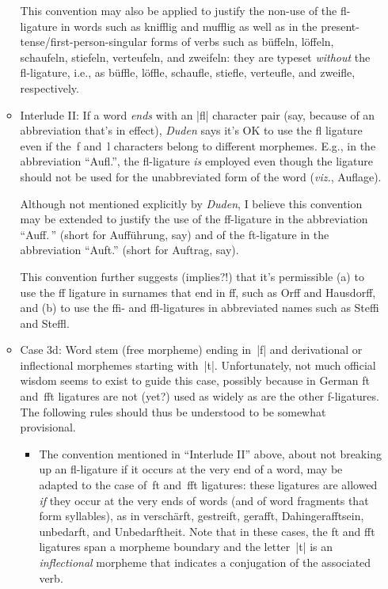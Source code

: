 \documentclass[11pt]{article}
\begin{document}
\begin{itemize}
\begin{itemize}
This convention may also be applied to justify the non-use of the fl-ligature in words such as knifflig and mufflig as well as in the present-tense/first-person-singular forms of verbs such as büffeln, löffeln, schaufeln, stiefeln, verteufeln, and zweifeln: they are typeset \emph{without} the fl-ligature, i.e., as büffle, löffle, schaufle, stiefle, verteufle, and zweifle, respectively.

\item Interlude II: If a word \emph{ends} with an |fl| character pair (say, because of an abbreviation that's in effect), \emph{Duden} says it's OK to use the fl ligature even if the~f and~l characters belong to different morphemes. E.g., in the abbreviation \enquote{Aufl.}, the fl-ligature \emph{is} employed even though the ligature should not be used for the unabbreviated form of the word (\emph{viz.}, Auflage).

Although not mentioned explicitly by \emph{Duden}, I believe this convention may be extended to justify the use of the ff-ligature in the abbreviation \enquote{Auff.\,} (short for Aufführung, say) and of the ft-ligature in the abbreviation \enquote{Auft.} (short for Auftrag, say).

This convention further suggests (implies?!) that it's permissible (a) to use the ff ligature in surnames that end in ff, such as Orff and Hausdorff, and (b) to use the ffi- and ffl-ligatures in abbreviated names such as Steffi and Steffl. 

\item Case 3d: Word stem (free morpheme) ending in~|f| and derivational or inflectional morphemes starting with~|t|. Unfortunately, not much official wisdom seems to exist to guide this case, possibly because in German ft and~fft ligatures are not (yet?) used as widely as are the other f-ligatures. The following rules should thus be understood to be somewhat provisional.

\begin{itemize}
\item The convention mentioned in \enquote{Interlude II} above, about not breaking up an fl-ligature if it occurs at the very end of a word, may be adapted to the case of~ft and~fft ligatures: these ligatures are allowed \emph{if} they occur at the very ends of words (and of word fragments that form syllables), as in verschärft, gestreift, gerafft, Dahingerafftsein, unbedarft, and Unbedarftheit. Note that in these cases, the ft and fft ligatures span a morpheme boundary and the letter~|t| is an \emph{inflectional} morpheme that indicates a conjugation of the associated verb.


\end{itemize}
\end{itemize}
\end{itemize}
\end{document}
